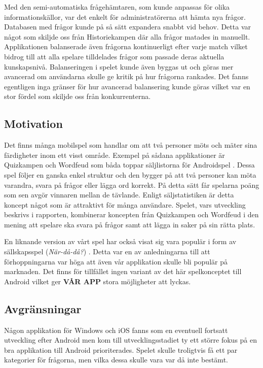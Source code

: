 \documentclass[a4paper, 11pt]{article}
\begin{document}
Med den semi-automatiska frågehämtaren, som kunde anpassas för olika informationskällor, var det enkelt för administratörerna att hämta nya frågor. Databasen med frågor kunde på så sätt expandera snabbt vid behov. Detta var något som skiljde oss från Historiekampen där alla frågor matades in manuellt. \\
Applikationen balanserade även frågorna kontinuerligt efter varje match vilket bidrog till att alla spelare tilldelades frågor som passade deras aktuella kunskapsnivå. Balanseringen i spelet kunde även byggas ut och göras mer avancerad om användarna skulle ge kritik på hur frågorna rankades. Det fanns egentligen inga gränser för hur avancerad balansering kunde göras vilket var en stor fördel som skiljde oss från konkurrenterna.


\subsection{Motivation}
Det finns många mobilspel som handlar om att två personer möts och mäter sina färdigheter inom ett visst område. Exempel på sådana applikationer är Quizkampen och Wordfeud som båda toppar säljlistorna för Androidspel \cite{appsalesrating}. Dessa spel följer en ganska enkel struktur och den bygger på att två personer kan möta varandra, svara på frågor eller lägga ord korrekt. På detta sätt får spelarna poäng som sen avgör vinnaren mellan de tävlande. Enligt säljstatistiken \cite{appsalesrating} är detta koncept något som är attraktivt för många användare. Spelet, vars utveckling beskrivs i rapporten, kombinerar koncepten från Quizkampen och Wordfeud i den mening att spelare ska svara på frågor samt att lägga in saker på sin rätta plats. 

En liknande version av vårt spel har också visat sig vara populär i form av sällskapsspel (\textit{När-då-då?}) \cite{nardada}. Detta var en av anledningarna till att förhoppningarna var höga att även vår applikation skulle bli populär på marknaden. Det finns för tillfället ingen variant av det här spelkonceptet till Android vilket ger \textbf{VÅR APP} stora möjligheter att lyckas.

\subsection{Avgränsningar}
Någon applikation för Windows och iOS fanns som en eventuell fortsatt utveckling efter Android men kom till utvecklingsstadiet ty ett större fokus på en bra applikation till Android prioriterades. Spelet skulle troligtvis få ett par kategorier för frågorna, men vilka dessa skulle vara var då inte bestämt. 
\end{document}
